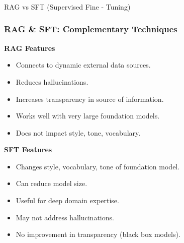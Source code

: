 




\begin{frame}[fragile]\frametitle{}
\begin{center}
{\Large RAG vs SFT (Supervised Fine - Tuning)}
\end{center}
\end{frame}




\begin{frame}[fragile]\frametitle{RAG \& SFT: Complementary Techniques}
\textbf{RAG Features}
\begin{itemize}
  \item Connects to dynamic external data sources.
  \item Reduces hallucinations.
  \item Increases transparency in source of information.
  \item Works well with very large foundation models.
  \item Does not impact style, tone, vocabulary.
\end{itemize}
\textbf{SFT Features}
\begin{itemize}
  \item Changes style, vocabulary, tone of foundation model.
  \item Can reduce model size.
  \item Useful for deep domain expertise.
  \item May not address hallucinations.
  \item No improvement in transparency (black box models).
\end{itemize}
\end{frame}

